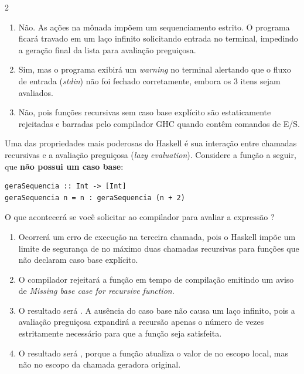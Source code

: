 \documentclass[a4paper,10pt,brazil]{article}
\begin{document}
\begin{multicols}{2}
\begin{enumerate}
  \item Não. As ações na mônada  impõem um sequenciamento estrito. O programa ficará travado em um laço infinito solicitando entrada no terminal, impedindo a geração final da lista para avaliação preguiçosa.

  \item Sim, mas o programa exibirá um \emph{warning} no terminal alertando que o fluxo de entrada (\emph{stdin}) não foi fechado corretamente, embora os 3 itens sejam avaliados.

  \item Não, pois funções recursivas sem caso base explícito são estaticamente rejeitadas e barradas pelo compilador GHC quando contêm comandos de E/S.


\end{enumerate}

Uma das propriedades mais poderosas do Haskell é sua interação entre chamadas recursivas e a avaliação preguiçosa (\emph{lazy evaluation}). Considere a função a seguir, que \textbf{não possui um caso base}:

\begin{verbatim}
geraSequencia :: Int -> [Int]
geraSequencia n = n : geraSequencia (n + 2)
\end{verbatim}

O que acontecerá se você solicitar ao compilador para avaliar a expressão ?

\begin{enumerate}
  \item Ocorrerá um erro de execução na terceira chamada, pois o Haskell impõe um limite de segurança de no máximo duas chamadas recursivas para funções que não declaram caso base explícito.
  \item O compilador rejeitará a função  em tempo de compilação emitindo um aviso de \emph{Missing base case for recursive function}.

  \item O resultado será \haskellinline{[10, 12, 14]}. A ausência do caso base não causa um laço infinito, pois a avaliação preguiçosa expandirá a recursão apenas o número de vezes estritamente necessário para que a função  seja satisfeita.

  \item O resultado será \haskellinline{[10, 10, 10]}, porque a função atualiza o valor de  no escopo local, mas não no escopo da chamada geradora original.


\end{enumerate}
\end{multicols}
\end{document}
